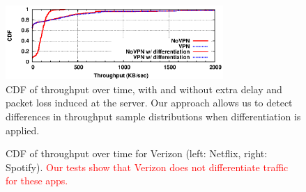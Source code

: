 \documentclass[letterpaper]{sig-alternate-2013}
\newcommand{\edit}[1]{\textcolor{red}{#1}}
\newcommand{\edit}[1]{\textcolor{black}{#1}}
\begin{document}



\begin{figure}[t!]
	\centering
	\includegraphics[width=3.25in]{figures/diff_no_diff.eps}
	\caption{CDF of throughput over time, with and without extra delay and packet loss induced at the server. 
	Our approach allows us to detect differences in throughput sample distributions when differentiation is applied. }
	\label{fig:diff}
\end{figure}


\begin{figure}[h]
\centering
\vspace{0.2in}
\caption{CDF of throughput over time for Verizon (left: Netflix, right: Spotify). \edit{Our tests show 
that Verizon does not differentiate traffic for these apps.} }
\label{fig:nodiff}
\end{figure}
\end{document}
